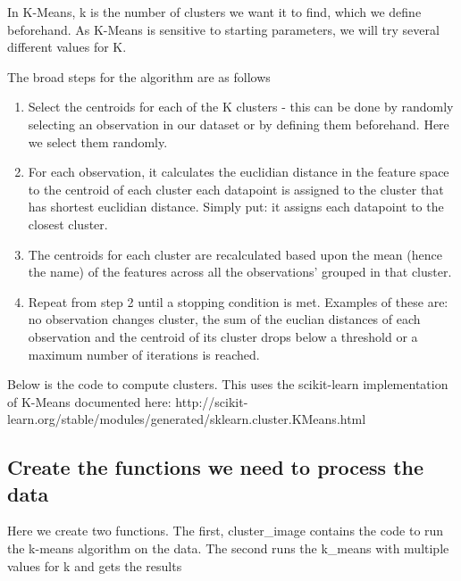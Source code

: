 \documentclass[11pt]{article}
\providecommand{\tightlist}{%
      \setlength{\itemsep}{0pt}\setlength{\parskip}{0pt}}
\begin{document}
In K-Means, k is the number of clusters we want it to find, which we
define beforehand. As K-Means is sensitive to starting parameters, we
will try several different values for K.

The broad steps for the algorithm are as follows

\begin{enumerate}
\def\labelenumi{\arabic{enumi}.}
\tightlist
\item
  Select the centroids for each of the K clusters - this can be done by
  randomly selecting an observation in our dataset or by defining them
  beforehand. Here we select them randomly.
\item
  For each observation, it calculates the euclidian distance in the
  feature space to the centroid of each cluster each datapoint is
  assigned to the cluster that has shortest euclidian distance. Simply
  put: it assigns each datapoint to the closest cluster.
\item
  The centroids for each cluster are recalculated based upon the mean
  (hence the name) of the features across all the observations' grouped
  in that cluster.
\item
  Repeat from step 2 until a stopping condition is met. Examples of
  these are: no observation changes cluster, the sum of the euclian
  distances of each observation and the centroid of its cluster drops
  below a threshold or a maximum number of iterations is reached.
\end{enumerate}

Below is the code to compute clusters. This uses the scikit-learn
implementation of K-Means documented here:
http://scikit-learn.org/stable/modules/generated/sklearn.cluster.KMeans.html

    \subsection{Create the functions we need to process the
data}\label{create-the-functions-we-need-to-process-the-data}

Here we create two functions. The first, cluster\_image contains the
code to run the k-means algorithm on the data. The second runs the
k\_means with multiple values for k and gets the results
\end{document}
